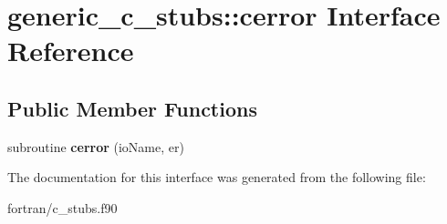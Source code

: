 \hypertarget{interfacegeneric__c__stubs_1_1cerror}{}\section{generic\+\_\+c\+\_\+stubs\+:\+:cerror Interface Reference}
\label{interfacegeneric__c__stubs_1_1cerror}
\subsection*{Public Member Functions}
\begin{DoxyCompactItemize}
\item 
\mbox{\label{interfacegeneric__c__stubs_1_1cerror_ae399a0e233cea40c642125990a6a5875}} 
subroutine {\bfseries cerror} (io\+Name, er)
\end{DoxyCompactItemize}


The documentation for this interface was generated from the following file\+:\begin{DoxyCompactItemize}
\item 
fortran/c\+\_\+stubs.\+f90\end{DoxyCompactItemize}
